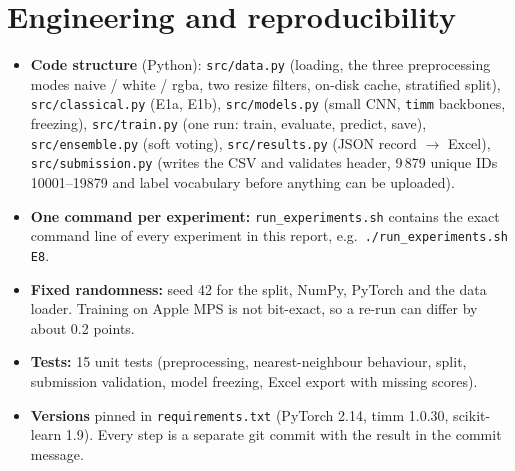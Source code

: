\documentclass[11pt,a4paper]{article}
\newcommand{\code}[1]{\texttt{#1}}
\begin{document}
\section{Engineering and reproducibility}

\begin{itemize}[leftmargin=*]
\item \textbf{Code structure} (Python): \code{src/data.py} (loading, the three preprocessing modes
naive / white / rgba, two resize filters, on-disk cache, stratified split), \code{src/classical.py}
(E1a, E1b), \code{src/models.py} (small CNN, \code{timm} backbones, freezing),
\code{src/train.py} (one run: train, evaluate, predict, save), \code{src/ensemble.py} (soft voting),
\code{src/results.py} (JSON record $\to$ Excel), \code{src/submission.py} (writes the CSV and validates
header, 9\,879 unique IDs 10001--19879 and label vocabulary before anything can be uploaded).
\item \textbf{One command per experiment:} \code{run\_experiments.sh} contains the exact command line of
every experiment in this report, e.g.\ \code{./run\_experiments.sh E8}.
\item \textbf{Fixed randomness:} seed 42 for the split, NumPy, PyTorch and the data loader. Training
on Apple MPS is not bit-exact, so a re-run can differ by about 0.2 points.
\item \textbf{Tests:} 15 unit tests (preprocessing, nearest-neighbour behaviour, split, submission
validation, model freezing, Excel export with missing scores).
\item \textbf{Versions} pinned in \code{requirements.txt} (PyTorch 2.14, timm 1.0.30, scikit-learn 1.9).
Every step is a separate git commit with the result in the commit message.
\end{itemize}

\end{document}
